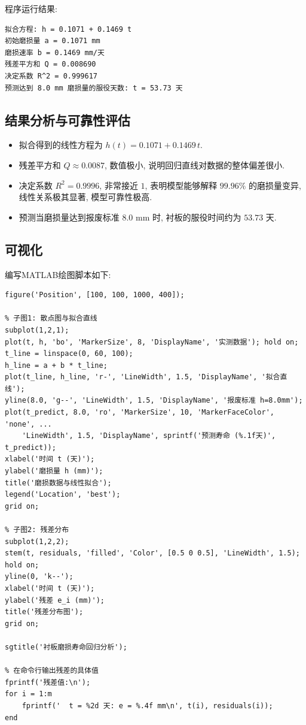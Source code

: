 \documentclass[12pt,a4paper]{ctexart}
\begin{document}
\noindent 程序运行结果: 
\begin{lstlisting}
拟合方程: h = 0.1071 + 0.1469 t
初始磨损量 a = 0.1071 mm
磨损速率 b = 0.1469 mm/天
残差平方和 Q = 0.008690
决定系数 R^2 = 0.999617
预测达到 8.0 mm 磨损量的服役天数: t = 53.73 天
\end{lstlisting}

\subsection{结果分析与可靠性评估}
\begin{itemize}
    \item 拟合得到的线性方程为 $h(t) = 0.1071 + 0.1469\,t$. 
    \item 残差平方和 $Q \approx 0.0087$, 数值极小, 说明回归直线对数据的整体偏差很小. 
    \item 决定系数 $R^2 = 0.9996$, 非常接近 $1$, 表明模型能够解释 $99.96\%$ 的磨损量变异, 线性关系极其显著, 模型可靠性极高. 
    \item 预测当磨损量达到报废标准 $8.0$ mm 时, 衬板的服役时间约为 $53.73$ 天. 
\end{itemize}

\subsection{可视化}
编写MATLAB绘图脚本如下: 
\begin{lstlisting}[caption={可视化代码}]
figure('Position', [100, 100, 1000, 400]);

% 子图1: 散点图与拟合直线
subplot(1,2,1);
plot(t, h, 'bo', 'MarkerSize', 8, 'DisplayName', '实测数据'); hold on;
t_line = linspace(0, 60, 100);
h_line = a + b * t_line;
plot(t_line, h_line, 'r-', 'LineWidth', 1.5, 'DisplayName', '拟合直线');
yline(8.0, 'g--', 'LineWidth', 1.5, 'DisplayName', '报废标准 h=8.0mm');
plot(t_predict, 8.0, 'ro', 'MarkerSize', 10, 'MarkerFaceColor', 'none', ...
    'LineWidth', 1.5, 'DisplayName', sprintf('预测寿命 (%.1f天)', t_predict));
xlabel('时间 t (天)');
ylabel('磨损量 h (mm)');
title('磨损数据与线性拟合');
legend('Location', 'best');
grid on;

% 子图2: 残差分布
subplot(1,2,2);
stem(t, residuals, 'filled', 'Color', [0.5 0 0.5], 'LineWidth', 1.5);
hold on;
yline(0, 'k--');
xlabel('时间 t (天)');
ylabel('残差 e_i (mm)');
title('残差分布图');
grid on;

sgtitle('衬板磨损寿命回归分析');

% 在命令行输出残差的具体值
fprintf('残差值:\n');
for i = 1:m
    fprintf('  t = %2d 天: e = %.4f mm\n', t(i), residuals(i));
end
\end{lstlisting}
\end{document}
